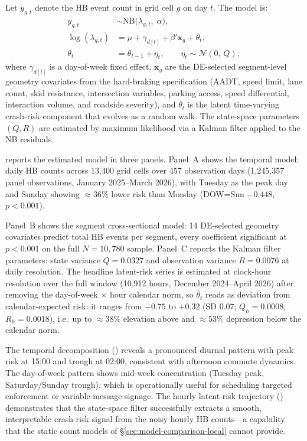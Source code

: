 \documentclass[letterpaper,8pt]{extarticle}  %
\begin{document}
\begin{doublespacing}
\begin{linenumbers}
Let $y_{g,t}$ denote the HB event count in grid cell $g$ on day $t$. The model is:
\begin{align}
  y_{g,t} &\sim \text{NB}\bigl(\lambda_{g,t},\;\alpha\bigr), \label{eq:ss-obs}\\
  \log(\lambda_{g,t}) &= \mu + \gamma_{d[t]} + \beta'\mathbf{x}_g + \theta_t, \label{eq:ss-linear}\\
  \theta_t &= \theta_{t-1} + \eta_t, \qquad \eta_t \sim \mathcal{N}(0,\,Q), \label{eq:ss-transition}
\end{align}
where $\gamma_{d[t]}$ is a day-of-week fixed effect, $\mathbf{x}_g$ are the DE-selected segment-level geometry covariates from the hard-braking specification (AADT, speed limit, lane count, skid resistance, intersection variables, parking access, speed differential, interaction volume, and roadside severity), and $\theta_t$ is the latent time-varying crash-risk component that evolves as a random walk. The state-space parameters $(Q, R)$ are estimated by maximum likelihood via a Kalman filter applied to the NB residuals.

 reports the estimated model in three panels. Panel~A shows the temporal model: daily HB counts across 13{,}400 grid cells over 457 observation days (1{,}245{,}357 panel observations, January 2025--March 2026), with Tuesday as the peak day and Sunday showing $\approx$36\% lower risk than Monday (DOW=Sun $-0.448$, $p<0.001$).



\FloatBarrier Panel~B shows the segment cross-sectional model: 14 DE-selected geometry covariates predict total HB events per segment, every coefficient significant at $p<0.001$ on the full $N=10{,}780$ sample. Panel~C reports the Kalman filter parameters: state variance $Q = 0.0327$ and observation variance $R = 0.0076$ at daily resolution. The headline latent-risk series is estimated at clock-hour resolution over the full window (10{,}912 hours, December 2024--April 2026) after removing the day-of-week $\times$ hour calendar norm, so $\hat\theta_t$ reads as deviation from calendar-expected risk: it ranges from $-0.75$ to $+0.32$ (SD $0.07$; $Q_h=0.0008$, $R_h=0.0018$), i.e.\ up to $\approx$38\% elevation above and $\approx$53\% depression below the calendar norm.

The temporal decomposition () reveals a pronounced diurnal pattern with peak risk at 15:00 and trough at 02:00, consistent with afternoon commute dynamics. The day-of-week pattern shows mid-week concentration (Tuesday peak, Saturday/Sunday trough), which is operationally useful for scheduling targeted enforcement or variable-message signage. The hourly latent risk trajectory () demonstrates that the state-space filter successfully extracts a smooth, interpretable crash-risk signal from the noisy hourly HB counts---a capability that the static count models of \S\ref{sec:model-comparison-local} cannot provide.


\end{linenumbers}
\end{doublespacing}
\end{document}
